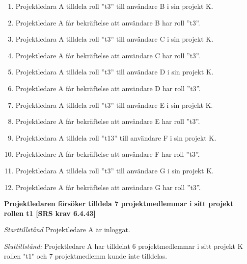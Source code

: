 \documentclass[a4paper]{article}
\begin{document}
\begin{FT}
\begin{enumerate}
\item Projektledara A tilldela roll ”t3” till användare B i sin projekt K. 
\item Projektledare A får bekräftelse att användare B har roll ”t3”.
\item Projektledara A tilldela roll ”t3” till användare C i sin projekt K. 
\item Projektledare A får bekräftelse att användare C har roll ”t3”.
\item Projektledara A tilldela roll ”t3” till användare D i sin projekt K. 
\item Projektledare A får bekräftelse att användare D har roll ”t3”.
\item Projektledara A tilldela roll ”t3” till användare E i sin projekt K. 
\item Projektledare A får bekräftelse att användare E har roll ”t3”.
\item Projektledara A tilldela roll ”t13” till användare F i sin projekt K. 
\item Projektledare A får bekräftelse att användare F har roll ”t3”.
\item Projektledara A tilldela roll ”t3” till användare G i sin projekt K. 
\item Projektledare A får bekräftelse att användare G har roll ”t3”.
\end{enumerate}

\item %
\textbf{Projektledaren försöker tilldela 7 projektmedlemmar i sitt projekt rollen t1 [SRS krav 6.4.43]}

\emph{Starttillstånd} Projektledare A är inloggat.

\emph{Sluttillstånd:} Projektledare A  har tilldelat 6 projektmedlemmar i sitt projekt K  rollen "t1" och 7 projektmedlemm kunde inte tilldelas.


\end{FT}
\end{document}
